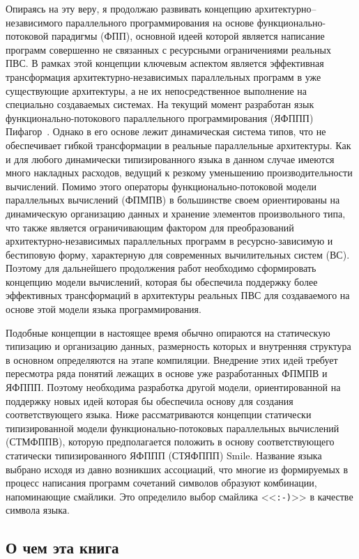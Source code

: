 Опираясь на эту веру, я продолжаю развивать концепцию архитектурно--неза\-ви\-си\-мо\-го параллельного программирования на основе функционально-потоковой парадигмы (ФПП), основной идеей которой является написание программ совершенно не связанных с ресурсными ограничениями реальных ПВС. В рамках этой концепции ключевым аспектом является эффективная трансформация архитектурно-независимых параллельных программ в уже существующие архитектуры, а не их непосредственное выполнение на специально создаваемых системах. На текущий момент разработан язык функционально-потокового параллельного программирования (ЯФППП) Пифагор~\cite{legalov-vt-2005}. Однако в его основе лежит динамическая система типов, что не обеспечивает гибкой трансформации в реальные параллельные архитектуры. Как и для любого динамически типизированного языка в данном случае имеются много накладных расходов, ведущий к резкому уменьшению производительности вычислений. Помимо этого операторы функционально-потоковой модели параллельных вычислений (ФПМПВ) в большинстве своем ориентированы на динамическую организацию данных и хранение элементов произвольного типа, что также является ограничивающим фактором для преобразований архитектурно-независимых параллельных программ в ресурсно-зависимую и бестиповую форму, характерную для современных вычилительных систем (ВС). Поэтому для дальнейшего продолжения работ необходимо сформировать концепцию модели вычислений, которая бы обеспечила поддержку более эффективных трансформаций в архитектуры реальных ПВС для создаваемого на основе этой модели языка программирования.

Подобные концепции в настоящее время обычно опираются на статическую типизацию и организацию данных, размерность которых и внутренняя структура в основном определяются на этапе компиляции. Внедрение этих идей требует пересмотра ряда понятий лежащих в основе уже разработанных ФПМПВ и ЯФППП. Поэтому необходима разработка другой модели, ориентированной на поддержку новых идей которая бы обеспечила основу для создания соответствующего языка. Ниже рассматриваются концепции статически типизированной модели функционально-потоковых параллельных вычислений (СТМФППВ), которую предполагается положить в основу соответствующего статически типизированного ЯФППП (СТЯФППП) Smile. Название языка выбрано исходя из давно возникших ассоциаций, что многие из формируемых в процесс написания программ сочетаний символов образуют комбинации, напоминающие смайлики. Это определило выбор смайлика <<\verb|:-)|>> в качестве символа языка.

\subsection*{О чем эта книга}

